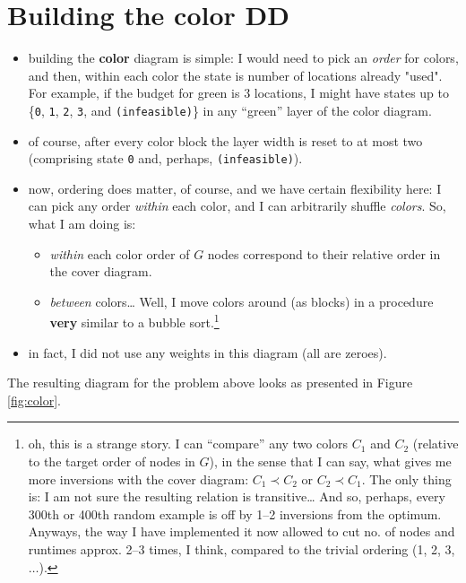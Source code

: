 \documentclass[11pt]{article}
\begin{document}
\section{Building the color DD}
\label{sec:org98db2f4}
\begin{itemize}
\item building the \textbf{color} diagram is simple: I would need to pick an \emph{order} for
colors, and then, within each color the state is number of locations already
"used". For example, if the budget for green is 3 locations, I might have
states up to \{\texttt{0}, \texttt{1}, \texttt{2}, \texttt{3}, and \texttt{(infeasible)}\} in any ``green'' layer
of the color diagram.
\item of course, after every color block the layer width is reset to at most two
(comprising state \texttt{0} and, perhaps, \texttt{(infeasible)}).
\item now, ordering does matter, of course, and we have certain flexibility here: I
can pick any order \emph{within} each color, and I can arbitrarily shuffle
\emph{colors}. So, what I am doing is:
\begin{itemize}
\item \emph{within} each color order of \(G\) nodes correspond to their relative order in the cover diagram.
\item \emph{between} colors\ldots{} Well, I move colors around (as blocks) in a procedure
\textbf{very} similar to a bubble sort.\footnote{oh, this is a strange story. I can ``compare'' any two colors \(C_1\)
and \(C_2\) (relative to the target order of nodes in \(G\)), in the sense that I
can say, what gives me more inversions with the cover diagram: \(C_1 \prec C_2\)
or \(C_2 \prec C_1\). The only thing is: I am not sure the resulting relation is
transitive\ldots{} And so, perhaps, every 300th or 400th random example is off by
1--2 inversions from the optimum. Anyways, the way I have implemented it now
allowed to cut no. of nodes and runtimes approx. 2--3 times, I think, compared
to the trivial ordering (1, 2, 3, \(\ldots\)).}
\end{itemize}
\item in fact, I did not use any weights in this diagram (all are zeroes).
\end{itemize}

The resulting diagram for the problem above looks as presented in Figure \ref{fig:color}.
\end{document}
